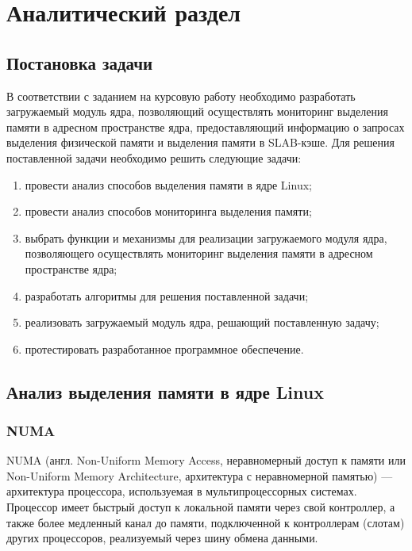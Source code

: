 \section{Аналитический раздел}

\subsection{Постановка задачи}

В соответствии с заданием на курсовую работу необходимо разработать загружаемый модуль ядра, позволяющий осуществлять мониторинг выделения памяти в адресном пространстве ядра, предоставляющий информацию о запросах выделения физической памяти и выделения памяти в SLAB-кэше.
Для решения поставленной задачи необходимо решить следующие задачи:
\begin{enumerate}
    \item провести анализ способов выделения памяти в ядре Linux;
    \item провести анализ способов мониторинга выделения памяти;
    \item выбрать функции и механизмы для реализации загружаемого модуля ядра, позволяющего осуществлять мониторинг выделения памяти в адресном пространстве ядра;
    \item разработать алгоритмы для решения поставленной задачи;
    \item реализовать загружаемый модуль ядра, решающий поставленную задачу;
    \item протестировать разработанное программное обеспечение.
\end{enumerate}

\subsection{Анализ выделения памяти в ядре Linux}

\subsubsection{NUMA}

NUMA (англ. Non-Uniform Memory Access, неравномерный доступ к памяти или Non-Uniform Memory Architecture, архитектура с неравномерной памятью) --- архитектура процессора, используемая в мультипроцессорных системах.
Процессор имеет быстрый доступ к локальной памяти через свой контроллер, а также более медленный канал до памяти, подключенной к контроллерам (слотам) других процессоров, реализуемый через шину обмена данными.~\cite{mem}

